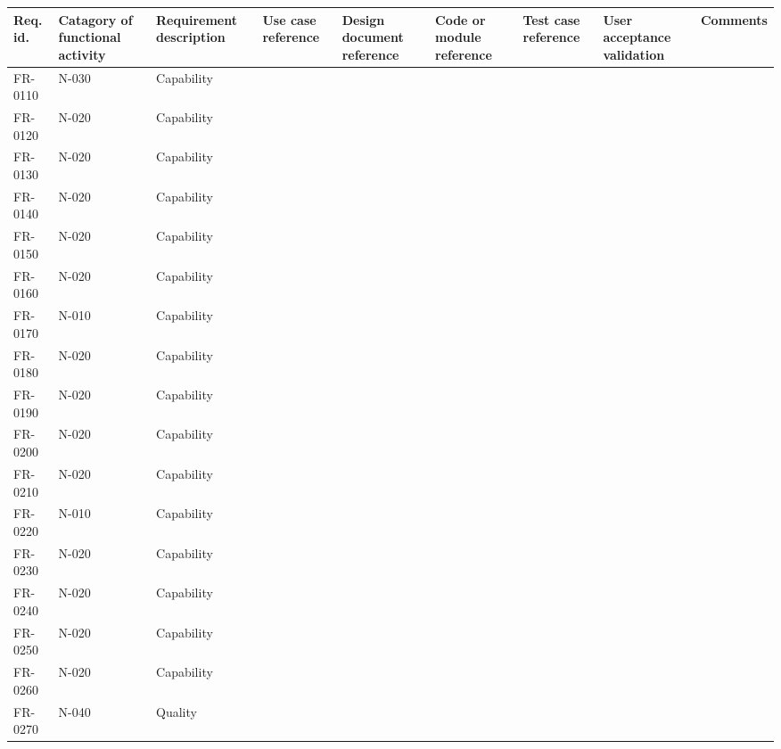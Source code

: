 \begin{sidewaystable}
\begin{table}[H]
\begin{tabular}{|p{2cm}|p{2cm}|p{3cm}|p{2cm}|p{2cm}|p{2cm}|p{2cm}|p{2cm}|p{2cm}|}
\hline
 Req. id. & Catagory of functional activity & Requirement description  & Use case reference & Design document reference & Code or module reference & Test case reference & User acceptance validation & Comments\\ \hline
 FR-0110 & N-030 & Capability & & & & & &\\ \hline
 FR-0120 & N-020 & Capability & & & & & &\\ \hline
 FR-0130 & N-020 & Capability & & & & & &\\ \hline
 FR-0140 & N-020 & Capability & & & & & &\\ \hline
 FR-0150 & N-020 & Capability & & & & & &\\ \hline
 FR-0160 & N-020 & Capability & & & & & &\\ \hline
 FR-0170 & N-010 & Capability & & & & & &\\ \hline
 FR-0180 & N-020 & Capability & & & & & &\\ \hline
 FR-0190 & N-020 & Capability & & & & & &\\ \hline
 FR-0200 & N-020 & Capability & & & & & &\\ \hline
 FR-0210 & N-020 & Capability & & & & & &\\ \hline
 FR-0220 & N-010 & Capability & & & & & &\\ \hline
 FR-0230 & N-020 & Capability & & & & & &\\ \hline
 FR-0240 & N-020 & Capability & & & & & &\\ \hline
 FR-0250 & N-020 & Capability & & & & & &\\ \hline
 FR-0260 & N-020 & Capability & & & & & &\\ \hline
 FR-0270 & N-040 & Quality    & & & & & &\\ \hline
\end{tabular}	
\end{table}






\end{sidewaystable}
